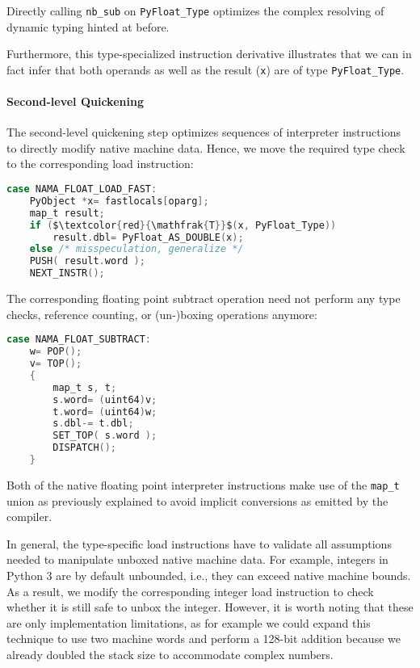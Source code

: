 \documentclass[preprint,10pt]{popl14conf}
\newcommand{\pyType}[1]{\texttt{Py#1\_Type}}
\begin{document}
Directly calling \texttt{nb_sub} on \pyType{Float} optimizes the complex resolving of dynamic typing
hinted at before.

Furthermore, this type-specialized instruction derivative illustrates that we can in fact infer that
both operands as well as the result (\texttt{x}) are of type \pyType{Float}.

\paragraph{Second-level Quickening}

The second-level quickening step optimizes sequences of interpreter instructions to directly modify
native machine data.
Hence, we move the required type check to the corresponding load instruction:
\begin{lstlisting}[mathescape=true,language=C,morekeywords={uint64,int64,TARGET,PUSH,NEXT_INSTR,T},style=othercode]
case NAMA_FLOAT_LOAD_FAST:
    PyObject *x= fastlocals[oparg];
    map_t result;
    if ($\textcolor{red}{\mathfrak{T}}$(x, PyFloat_Type))
        result.dbl= PyFloat_AS_DOUBLE(x);
    else /* misspeculation, generalize */
    PUSH( result.word );
    NEXT_INSTR();
\end{lstlisting}
The corresponding floating point subtract operation need not perform any type checks, reference
counting, or (un-)boxing operations anymore:
\begin{lstlisting}[language=C,mathescape=true,style=othercode,morekeywords={uint64,map_t}]
case NAMA_FLOAT_SUBTRACT:
    w= POP();
    v= TOP();
    {
        map_t s, t;
        s.word= (uint64)v;
        t.word= (uint64)w;
        s.dbl-= t.dbl;
        SET_TOP( s.word );
        DISPATCH();
    }
\end{lstlisting}

Both of the native floating point interpreter instructions make use of the \texttt{map_t}
union as previously explained to avoid implicit conversions as emitted by the compiler.

In general, the type-specific load instructions have to validate all assumptions needed to
manipulate unboxed native machine data.
For example, integers in Python 3 are by default unbounded, i.e., they can exceed native machine
bounds.
As a result, we modify the corresponding integer load instruction to check whether it is still safe
to unbox the integer.
However, it is worth noting that these are only implementation limitations, as for example we could
expand this technique to use two machine words and perform a 128-bit addition because we already
doubled the stack size to accommodate complex numbers.
\end{document}
